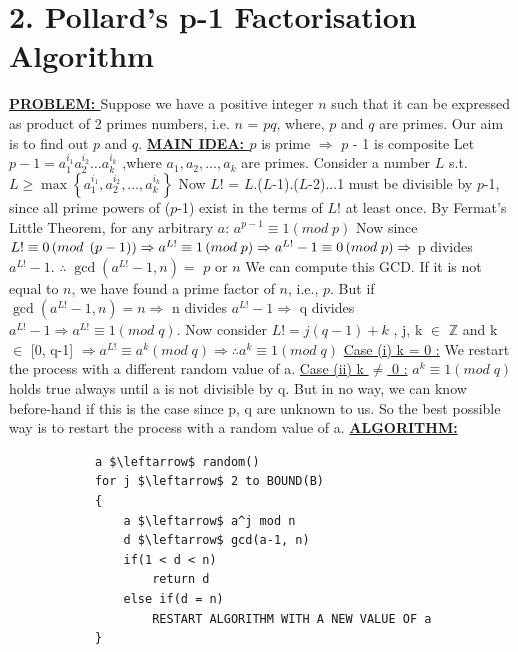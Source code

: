 \documentclass[11pt]{article}
\begin{document}



\section*{2. Pollard’s p-1 Factorisation Algorithm}
\begin{flushleft}
    \textbf{\underline{PROBLEM: }} Suppose we have a positive integer $n$ such that it can be expressed as product of 2 primes numbers, i.e. $n$ = $pq$, where, $p$ and $q$ are primes.
    Our aim is to find out $p$ and $q$.
    \break \break
    \textbf{\underline{MAIN IDEA: }}\break
        $p$ is prime $\Rightarrow$ $p$ - 1 is composite
        \break
        Let $p-1=a^{i_{1}}_{1}a^{i_{2}}_{2}\ldots a^{i_{k}}_{k}$ \quad \quad ,where $a_{1},a_{2},\ldots ,a_{k}$ are primes.
        \break
        Consider a number $L$ s.t. $L\geq \max \left\{ a^{i_{1}}_{1}, a^{i_{2}}_{2}, \ldots , a^{i_{k}}_{k}\right\} $
        \break
        Now $L$! = $L$.($L$-1).($L$-2)...1 must be divisible by $p$-1, since all prime powers of ($p$-1) exist in the terms of $L$! at least once.
        \break\break
        By Fermat's Little Theorem, for any arbitrary $a$: \quad $a^{p-1}\equiv 1\left( mod \;p\right)$
        \break
        Now since $L!\equiv 0\left(mod\; \left(p-1\right)\right)  \Rightarrow   a^{L!}\equiv 1\left( mod \;p\right) \Rightarrow   a^{L!}-1\equiv 0\left( mod \;p\right)\break \Rightarrow $  p divides $a^{L!}-1$.\break
        $ \therefore \; \gcd \left( a^{L!}-1,n\right) =$ $p$ or $n$
        \break
        We can compute this GCD. If it is not equal to $n$, we have found a prime factor of $n$, i.e., $p$. But if $\gcd \left( a^{L!}-1,n\right) = n  \Rightarrow$ n divides $a^{L!}-1 \Rightarrow$ q divides $a^{L!}-1 \Rightarrow a^{L!}\equiv 1\left( mod \;q\right)$.
        \break
        Now consider $L!=j\left( q-1\right) +k$ \quad , j, k $\in$ $\mathbb{Z}$  and k $\in$ [0, q-1]
        \break
        $\Rightarrow a^{L!}\equiv a^{k}\left( mod \;q\right) \Rightarrow \therefore a^{k}\equiv 1\left( mod \;q\right) $
        \break \break
        \underline{Case (i) k = 0 :} We restart the process with a different random value of a.
        \break
        \underline{Case (ii) k $\neq$ 0 :} $a^{k}\equiv 1\left( mod \;q\right) $ holds true always until a is not divisible by q. But in no way, we can know before-hand if this is the case since p, q are unknown to us. So the best possible way is to restart the process with a random value of a.
        \break \break
    \textbf{\underline{ALGORITHM: }}
        \begin{lstlisting}
            a $\leftarrow$ random()
            for j $\leftarrow$ 2 to BOUND(B)
            {
                a $\leftarrow$ a^j mod n
                d $\leftarrow$ gcd(a-1, n)
                if(1 < d < n)
                    return d
                else if(d = n)
                    RESTART ALGORITHM WITH A NEW VALUE OF a
            }
        \end{lstlisting}
    

\end{flushleft}
\end{document}
